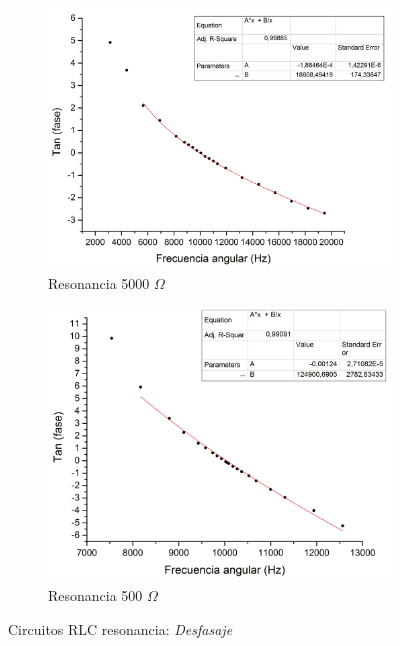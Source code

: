 \documentclass[11pt,a4paper]{article}
\begin{document}
\begin{figure}[h!]
\begin{subfigure}{0.5\textwidth}
\includegraphics[scale=0.34]{RLC_RES_5000_Tan(fase)vsF}
  \caption{Resonancia 5000 $\Omega$}
  \label{subfig:RES_D.a}
\end{subfigure}
\begin{subfigure}{0.5\textwidth}
\includegraphics[scale=0.34]{RLC_RES_500_Tan(fase)vsF}
  \caption{Resonancia 500 $\Omega$}
  \label{subfig:RES_D.b}
\end{subfigure}
  \caption{Circuitos RLC resonancia: \textit{Desfasaje}}
  \label{fig:RES_D}
\end{figure}
\end{document}
